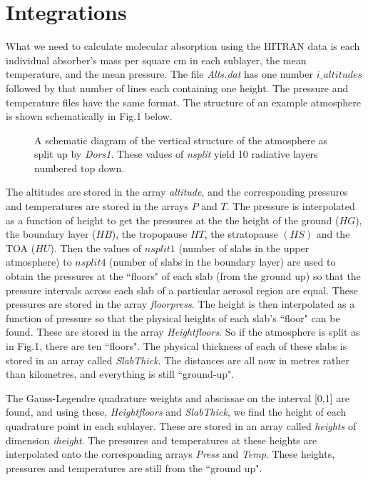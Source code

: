 \documentclass[12pt]{article}
\begin{document}
\section{Integrations}

What we need to calculate molecular absorption using the HITRAN data
is each individual absorber's mass per square cm
in each sublayer, the mean temperature, and the mean pressure. The file {\it Alts.dat}
has one number $i\_altitudes$ followed by that number of lines each containing one height.
The pressure and temperature files have the same format. The structure of an example
atmosphere is shown schematically in Fig.1 below.
\vspace*{10cm}
\begin{figure}[htb]
\caption{A schematic diagram of the vertical structure of the atmosphere
as split up by {\it Dors1}. These values of {\it nsplit}  yield 10 radiative
layers  numbered top down.}
\end{figure}

The altitudes are stored in the array {\it altitude}, and the corresponding
pressures and temperatures are stored in the arrays $P$ and $T$.
The pressure is interpolated as a function of height to get the pressures
at the the height of the ground ($HG$), the boundary layer ($HB$), the 
tropopause $HT$, the stratopause $(HS)$ and the TOA ($HU$). Then the values
of $nsplit1$ (number of slabs in the upper atmosphere) to $nsplit4$ (number of
slabs in the boundary layer) are used to obtain the pressures at the ``floors"
of each slab (from the ground up) so that the pressure intervals across each
 slab of a particular aerosol region are equal. These pressures are stored in the
array {\it floorpress}. The height is then interpolated as a function of pressure
so that the physical heights of each slab's ``floor" can be found. These
are stored in the array {\it Heightfloors}. So if the atmosphere is split as in
Fig.1, there are ten ``floors". The physical thickness of each of these slabs
is stored in an array called {\it SlabThick}. The distances are all now in metres
rather than kilometres, and everything is still ``ground-up".

The Gauss-Legendre quadrature weights and abscissae on the interval [0,1] are found, and using
these, {\it Heightfloors} and {\it SlabThick}, we find the height of each quadrature point 
in each sublayer. These are stored in an array called {\it heights} of dimension {\it iheight}.
The pressures and temperatures at these heights are interpolated onto the corresponding
arrays {\it Press} and {\it Temp}. These heights, pressures and temperatures are still
from the ``ground up".
\end{document}
